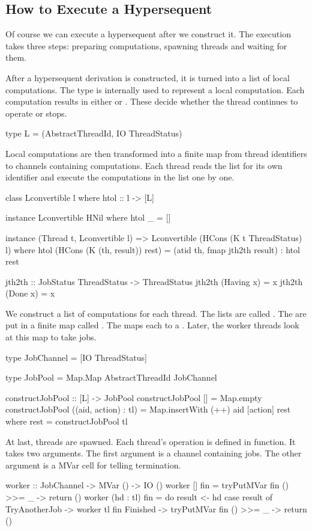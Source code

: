 \subsection{How to Execute a Hypersequent}
Of course we can execute a hypersequent after we construct it.  The
execution takes three steps: preparing computations, spawning
threads and waiting for them.

After a hypersequent derivation is constructed, it is turned into a list
of local computations.  The type \verb@L@ is internally used to represent a
local computation.  Each computation results in either \verb@TryAnotherJob@
or \verb@Finished@.  These decide whether the thread continues to operate or stops.
\begin{code}
type L = (AbstractThreadId, IO ThreadStatus)
\end{code}

Local computations are then transformed into a finite map from thread
identifiers to channels containing computations. Each thread reads the list for
its own identifier and execute the computations in the list one by one.
\begin{code}
class Lconvertible l where
    htol :: l -> [L]

instance Lconvertible HNil where
    htol _ = []

instance (Thread t, Lconvertible l) =>
 Lconvertible (HCons (K t ThreadStatus) l) where
    htol (HCons (K (th, result)) rest) =
      (atid th, fmap jth2th result) : htol rest

jth2th :: JobStatus ThreadStatus -> ThreadStatus
jth2th (Having x) = x
jth2th (Done x) = x
\end{code}

We construct a list of computations for each thread.  The lists are
called \verb@JobChannel@s.  The \verb@JobChannel@s are put in a finite map called
\verb@JobPool@.  The \verb@JobPool@ maps each \verb@AbstractThreadId@ to a
\verb@JobChannel@.  Later, the worker threads look at this map to take jobs.
\begin{code}
type JobChannel = [IO ThreadStatus]

type JobPool =
    Map.Map AbstractThreadId JobChannel

constructJobPool :: [L] -> JobPool
constructJobPool [] = Map.empty
constructJobPool ((aid, action) : tl) =
  Map.insertWith (++) aid [action] rest
     where
       rest = constructJobPool tl
\end{code}

At last, threads are spawned.  Each thread's operation is defined in
\verb@worker@ function.  It takes two arguments.  The first argument is a
channel containing jobs.  The other argument is a MVar cell for telling
termination.
\begin{code}
worker :: JobChannel -> MVar () -> IO ()
worker [] fin = tryPutMVar fin () >>= \_ -> return ()
worker (hd : tl) fin = do
  result <- hd
  case result of
    TryAnotherJob -> worker tl fin
    Finished -> tryPutMVar fin () >>= \_ -> return ()
\end{code}


